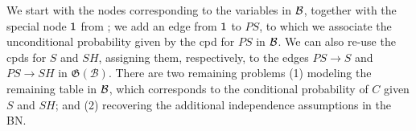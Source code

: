 \documentclass{article}
\theoremstyle{plain}
\theoremstyle{definition}
\newenvironment{example}
	{\pushQED{\qed}\renewcommand{\qedsymbol}{$\triangle$}\examplex}
	{\popQED\endexamplex%
}
\theoremstyle{remark}
\newcommand{\dg}[1]{\mathfrak{#1}}
\newcommand{\PDGof}[1]{\dg G(#1)}
\numberwithin{equation}{section}
\begin{document}
\begin{example}[emulating a BN]
We start with the nodes corresponding to the variables in $\cal B$,
together with the 
special node $\sf 1$ from %
; we add
an edge from ${\sf 1}$ to $\mathit{PS}$, to which we associate the
unconditional probability 
given by the cpd for $\mathit{PS}$ in $\cal B$. 
We can also re-use the cpds for $S$ and
                $\mathit{SH}$, assigning them, respectively, to the
                edges $PS \to S$ and $PS \to SH$ in $\PDGof{{\mathcal
                B}}$. There are two remaining problems
				(1) modeling
                the remaining table in $\cal B$, which corresponds to
                the conditional probability of $C$ given $S$ and $SH$; and
                (2) recovering the additional independence assumptions
                in the BN. 


\end{example}
\end{document}
